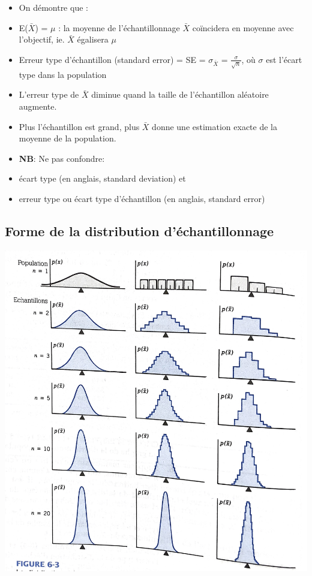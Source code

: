 \documentclass[
]{article}
\begin{document}
\begin{itemize}
\item
  On démontre que :
\item
  E(\(\bar{X}\)) = \(\mu\) : la moyenne de l'échantillonnage \(\bar{X}\)
  coïncidera en moyenne avec l'objectif, ie. \(\bar{X}\) égalisera
  \(\mu\)
\item
  Erreur type d'échantillon (standard error) = SE = \(\sigma_{\bar{X}}\)
  = \(\frac{\sigma}{\sqrt{n}}\), où \(\sigma\) est l'écart type dans la
  population
\item
  L'erreur type de \(\bar{X}\) diminue quand la taille de l'échantillon
  aléatoire augmente.
\item
  Plus l'échantillon est grand, plus \(\bar{X}\) donne une estimation
  exacte de la moyenne de la population.
\item
  \textbf{NB}: Ne pas confondre:
\item
  écart type (en anglais, standard deviation) et
\item
  erreur type ou écart type d'échantillon (en anglais, standard error)
\end{itemize}

\hypertarget{forme-de-la-distribution-duxe9chantillonnage}{%
\subsection{Forme de la distribution
d'échantillonnage}\label{forme-de-la-distribution-duxe9chantillonnage}}

\includegraphics{../Images/distribution_echantillonnage.jpg}
\end{document}
